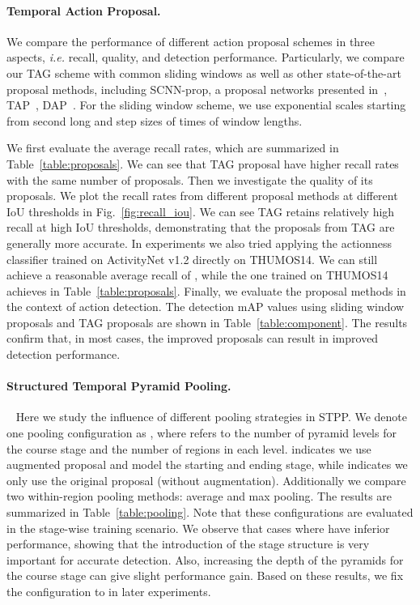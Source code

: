 \documentclass[10pt,twocolumn,letterpaper]{article}
\begin{document}
\paragraph{Temporal Action Proposal.}

We compare the performance of different action proposal schemes in three aspects, \emph{i.e.} recall, quality, and detection performance.
Particularly, we compare our TAG scheme with common sliding windows as well as other state-of-the-art proposal methods, including
SCNN-prop, a proposal networks presented in~\cite{Shou2016SCNN},
TAP~\cite{caba2016cvpr}, DAP~\cite{Escorcia2016DAP}.
For the sliding window scheme, we use  exponential scales starting from  second long
and step sizes of  times of window lengths.

We first evaluate the average recall rates, which are summarized in Table~\ref{table:proposals}.
We can see that TAG proposal have higher recall rates with the same number of proposals.
Then we investigate the quality of its proposals.
We plot the recall rates from different proposal methods at different IoU thresholds in Fig.~\ref{fig:recall_iou}.
We can see TAG retains relatively high recall at high IoU thresholds,
demonstrating that the proposals from TAG are generally more accurate.
In experiments we also tried applying the actionness classifier trained on ActivityNet v1.2 directly on THUMOS14.
We can still achieve a reasonable average recall of , while the one trained on THUMOS14 achieves  in Table~\ref{table:proposals}.
Finally, we evaluate the proposal methods in the context of action detection.
The detection mAP values using sliding window proposals and TAG proposals are shown in Table~\ref{table:component}.
The results confirm that, in most cases, the improved proposals can result in improved detection performance.

\vspace{-12pt}
\paragraph{Structured Temporal Pyramid Pooling.}~\label{sec:stpp_tpp}
Here we study the influence of different pooling strategies in STPP.
We denote one pooling configuration as , where  refers to the number of pyramid levels for the course stage and  the number of regions in each level.  indicates we use augmented proposal and model the starting and ending stage, while  indicates we only use the original proposal (without augmentation).
Additionally we compare two within-region pooling methods: average and max pooling.
The results are summarized in Table~\ref{table:pooling}.
Note that these configurations are evaluated in the stage-wise training scenario.
We observe that cases where  have inferior performance, showing that the introduction of the stage structure is very important for accurate detection.
Also, increasing the depth of the pyramids for the course stage can give slight performance gain.
Based on these results, we fix the configuration to  in later experiments.
\end{document}
